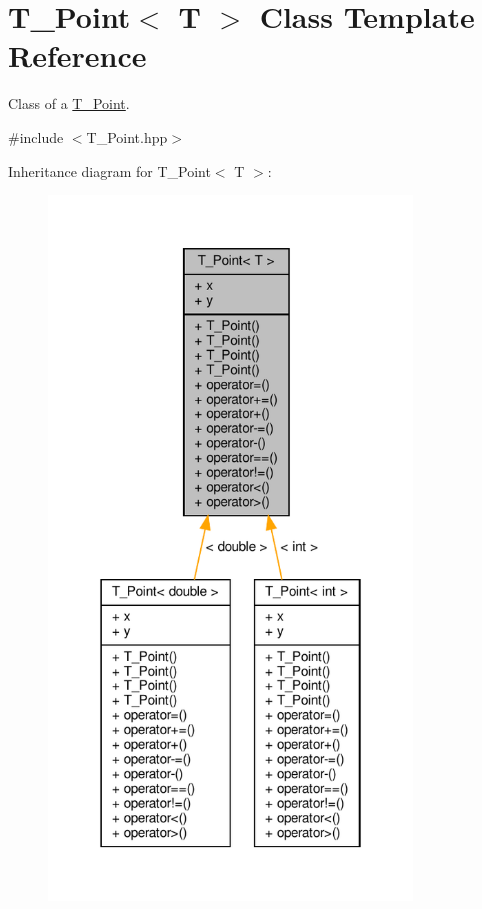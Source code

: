 \hypertarget{classT__Point}{}\section{T\+\_\+\+Point$<$ T $>$ Class Template Reference}
\label{classT__Point}


Class of a \hyperlink{classT__Point}{T\+\_\+\+Point}.  




{\ttfamily \#include $<$T\+\_\+\+Point.\+hpp$>$}



Inheritance diagram for T\+\_\+\+Point$<$ T $>$\+:
\nopagebreak
\begin{figure}[H]
\begin{center}
\leavevmode
\includegraphics[width=274pt]{classT__Point__inherit__graph}
\end{center}
\end{figure}


